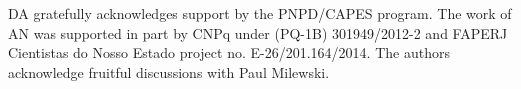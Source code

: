 \documentclass[11pt]{article}
\begin{document}
DA gratefully acknowledges support by the PNPD/CAPES program. 
The work of AN was supported in part by CNPq under (PQ-1B) 301949/2012-2 and FAPERJ Cientistas do Nosso Estado
project no. E-26/201.164/2014. 
The authors acknowledge fruitful discussions with Paul Milewski.


\end{document}
